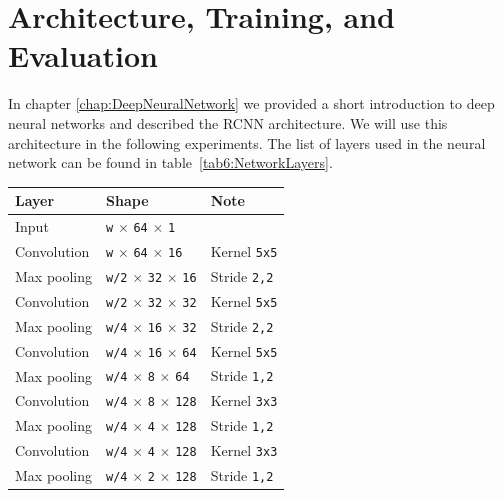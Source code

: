 \section{Architecture, Training, and Evaluation}
\label{sec:ArchitectureTrainingEvaluation}

In chapter \ref{chap:DeepNeuralNetwork} we provided a short introduction to deep neural networks and described the RCNN architecture. We will use this architecture in the following experiments. The list of layers used in the neural network can be found in table~\ref{tab6:NetworkLayers}.

\begin{table}[h] \centering
\begin{tabular}{lll}
\toprule
\textbf{Layer} & \textbf{Shape} & \textbf{Note} \\
\midrule
Input & \texttt{w} $\times$ \texttt{64} $\times$ \texttt{1} & \\
\midrule
Convolution & \texttt{w} $\times$ \texttt{64} $\times$ \texttt{16} & Kernel \texttt{5x5} \\
Max pooling & \texttt{w/2} $\times$ \texttt{32} $\times$ \texttt{16} & Stride \texttt{2,2} \\

Convolution & \texttt{w/2} $\times$ \texttt{32} $\times$ \texttt{32} & Kernel \texttt{5x5} \\
Max pooling & \texttt{w/4} $\times$ \texttt{16} $\times$ \texttt{32} & Stride \texttt{2,2} \\

Convolution & \texttt{w/4} $\times$ \texttt{16} $\times$ \texttt{64} & Kernel \texttt{5x5} \\
Max pooling & \texttt{w/4} $\times$ \texttt{8} $\times$ \texttt{64} & Stride \texttt{1,2} \\

Convolution & \texttt{w/4} $\times$ \texttt{8} $\times$ \texttt{128} & Kernel \texttt{3x3} \\
Max pooling & \texttt{w/4} $\times$ \texttt{4} $\times$ \texttt{128} & Stride \texttt{1,2} \\

Convolution & \texttt{w/4} $\times$ \texttt{4} $\times$ \texttt{128} & Kernel \texttt{3x3} \\
Max pooling & \texttt{w/4} $\times$ \texttt{2} $\times$ \texttt{128} & Stride \texttt{1,2} \\


\end{tabular}
\end{table}

